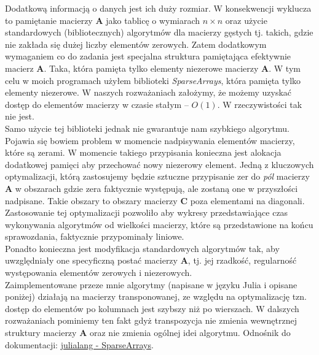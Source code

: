 \documentclass[]{article}
\newcommand{\mA}{\bm{A}}
\newcommand{\mC}{\bm{C}}
\begin{document}
	Dodatkową informacją o danych jest ich duży rozmiar. W konsekwencji wyklucza to pamiętanie macierzy $\mA$ jako tablicę o wymiarach $n \times n$ oraz użycie standardowych (bibliotecznych) algorytmów dla macierzy gęstych tj. takich, gdzie
	nie zakłada się dużej liczby elementów zerowych. Zatem dodatkowym wymaganiem co do zadania jest specjalna struktura pamiętająca efektywnie macierz $\mA$. Taka, która pamięta tylko elementy niezerowe macierzy $\mA$. W tym celu w moich programach użyłem biblioteki \textit{SparseArrays}, która pamięta tylko elementy niezerowe. W naszych rozważaniach założymy, że możemy uzyskać dostęp do elementów macierzy w czasie stałym -- $O(1)$. W rzeczywistości tak nie jest. \\
	Samo użycie tej biblioteki jednak nie gwarantuje nam szybkiego algorytmu. Pojawia się bowiem problem w momencie nadpisywania elementów macierzy, które są zerami. W momencie takiego przypisania konieczna jest alokacja dodatkowej pamięci aby przechować nowy niezerowy element. Jedną z kluczowych optymalizacji, którą zastosujemy będzie sztuczne przypisanie zer do \textit{pól} macierzy $\mA$ w obszarach gdzie zera faktycznie występują, ale zostaną one w przyszłości nadpisane. Takie obszary to obszary macierzy $\mC$ poza elementami na diagonali. Zastosowanie tej optymalizacji pozwoliło aby wykresy przedstawiające czas wykonywania algorytmów od wielkości macierzy, które są przedstawione na końcu sprawozdania, faktycznie przypominały liniowe.\\
	Ponadto konieczna jest modyfikacja standardowych algorytmów tak, aby uwzględniały one specyficzną postać macierzy $\mA$, tj.
	jej rzadkość, regularność występowania elementów zerowych i niezerowych.\\
	
	\noindent Zaimplementowane przeze mnie algorytmy (napisane w języku Julia i opisane poniżej) działają na macierzy transponowanej, ze względu na optymalizację tzn. dostęp do elementów po kolumnach jest szybszy niż po wierszach. W dalszych rozważaniach pominiemy ten fakt gdyż transpozycja nie zmienia wewnętrznej struktury macierzy $\mA$ oraz nie zmienia ogólnej idei algorytmu.
	Odnośnik do dokumentacji: 
	\href{https://docs.julialang.org/en/v1/stdlib/SparseArrays/}{julialang - SparseArrays}.
	
\end{document}
